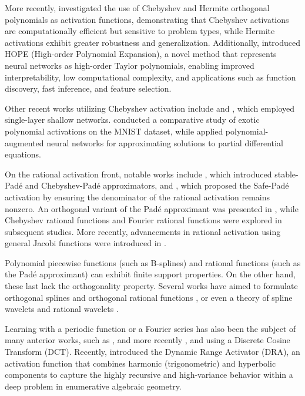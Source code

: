 \documentclass{article} %
\theoremstyle{plain}
\theoremstyle{definition}
\theoremstyle{remark}
\begin{document}
More recently, \cite{nebioglu2023higher} investigated the use of Chebyshev and Hermite orthogonal polynomials as activation functions, demonstrating that Chebyshev activations are computationally efficient but sensitive to problem types, while Hermite activations exhibit greater robustness and generalization. Additionally, \cite{xiao2024hope} introduced HOPE (High-order Polynomial Expansion), a novel method that represents neural networks as high-order Taylor polynomials, enabling improved interpretability, low computational complexity, and applications such as function discovery, fast inference, and feature selection.

Other recent works utilizing Chebyshev activation include \cite{deepthi2023development} and \cite{rezaeian2025sl2a}, which employed single-layer shallow networks. \citet{seydi2024exploring} conducted a comparative study of exotic polynomial activations on the MNIST dataset, while \citet{cooley2024polynomial} applied polynomial-augmented neural networks for approximating solutions to partial differential equations.
 
On the rational activation front, notable works include \cite{trefethen1987pade}, which introduced stable-Padé and Chebyshev-Padé approximators, and \cite{Molina2020Padé}, which proposed the Safe-Padé activation by ensuring the denominator of the rational activation remains nonzero. An orthogonal variant of the Padé approximant was presented in \cite{biswas2021orthogonal}, while Chebyshev rational functions \cite{castellanos1993rational} and Fourier rational functions \cite{geer1995rational} were explored in subsequent studies. More recently, advancements in rational activation using general Jacobi functions were introduced in \cite{aghaei2024rkan, aghaei2024fkan}.

Polynomial piecewise functions (such as B-splines) and rational functions (such as the Padé approximant) can exhibit finite support properties. On the other hand, these last lack the orthogonality property. Several works have aimed to formulate orthogonal splines \cite{mason1993orthogonal, alavi2023orthogonal} and orthogonal rational functions \cite{bultheel2001orthogonal}, or even a theory of spline wavelets \cite{chui1991cardinal} and rational wavelets \cite{zheng1999rational, choueiter2007implementation}.

Learning with a periodic function or a Fourier series has also been the subject of many anterior works, such as \cite{sitzmann2020implicit}, and more recently \cite{mehrabian2025implicit}, and \cite{martinez2024enn} using a Discrete Cosine Transform (DCT). Recently, \cite{hashemi2025can} introduced the Dynamic Range Activator (DRA), an activation function that combines harmonic (trigonometric) and hyperbolic components to capture the highly recursive and high-variance behavior within a deep problem in enumerative algebraic geometry.
\end{document}
